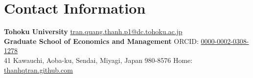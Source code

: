 \section{\sc Contact Information}
{\bf Tohoku University}     \hfill   \href{mailto:tran.quang.thanh.p1@dc.tohoku.ac.jp}{tran.quang.thanh.p1@dc.tohoku.ac.jp}\\
{\bf Graduate School of Economics and Management}  	 		\hfill ORCID: \href{https://orcid.org/0000-0002-0308-1278}{0000-0002-0308-1278}\\
41 Kawauchi, Aoba-ku, Sendai, Miyagi, Japan 980-8576 \hfill Home: \href{https://thanhqtran.github.com}{thanhqtran.github.com} \\
\\


